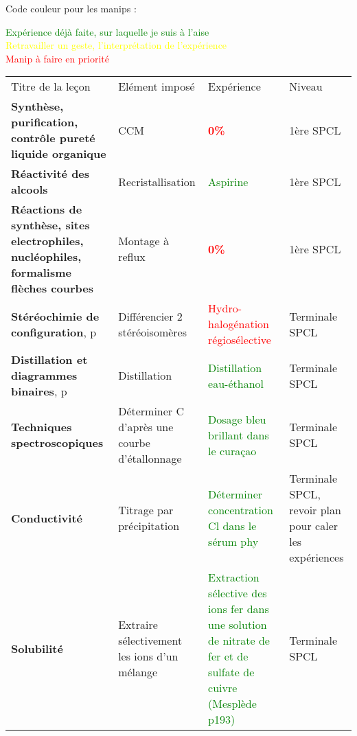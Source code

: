 \begin{changemargin}{-1.5cm}{-0cm}
\begin{tabularx}{\paperwidth-2cm}{| X | X | c | X |}
  
\end{tabularx}
\end{changemargin}
\newpage
\begin{changemargin}{-1.5cm}{0cm}

Code couleur pour les manips :\\
\begin{center}
\textcolor{green}{Expérience déjà faite, sur laquelle je suis à l'aise}\\
\textcolor{yellow}{Retravailler un geste, l'interprétation de l'expérience}\\
\textcolor{red}{Manip à faire en priorité}\\
\end{center}

\begin{tabularx}{\paperwidth-2cm}{| X | X | X | X |}
  \hline
  \rowcolor{gray!20}\multicolumn{4}{c}{Avancement préparation oraux Leçons Chimie} \\
  \hline 
  Titre de la leçon & Elément imposé & Expérience & Niveau \\
  \hline
  \textbf{Synthèse, purification, contrôle pureté liquide organique} & CCM & \textcolor{red}{\textbf{0\%}}  & 1ère SPCL  \\
  \hline
  \textbf{Réactivité des alcools} & Recristallisation & \textcolor{green}{Aspirine}  & 1ère SPCL  \\
  \hline
  \textbf{Réactions de synthèse, sites electrophiles, nucléophiles, formalisme flèches courbes} & Montage à reflux & \textcolor{red}{\textbf{0\%}}  & 1ère SPCL \\
  \hline
  \textbf{Stéréochimie de configuration}, p\pageref{LC_Stéréochimie} & Différencier 2 stéréoisomères & \textcolor{red}{Hydro-halogénation régiosélective}  & Terminale SPCL \\
  \hline
  \textbf{Distillation et diagrammes binaires}, p\pageref{LC_Distillation} & Distillation & \textcolor{green}{Distillation eau-éthanol}  & Terminale SPCL \\
  \hline
   \textbf{Techniques spectroscopiques} & Déterminer C d'après une courbe d'étallonnage & \textcolor{green}{Dosage bleu brillant dans le curaçao}  & Terminale SPCL \\
  \hline
  \textbf{Conductivité} & Titrage par précipitation & \textcolor{green}{Déterminer concentration Cl dans le sérum phy}  & Terminale SPCL, revoir plan pour caler les expériences\\
  \hline
  \textbf{Solubilité} & Extraire sélectivement les ions d'un mélange & \textcolor{green}{Extraction sélective des ions fer dans une solution de nitrate de fer et de sulfate de cuivre (Mesplède p193)}  & Terminale SPCL \\

\end{tabularx}
\end{changemargin}
